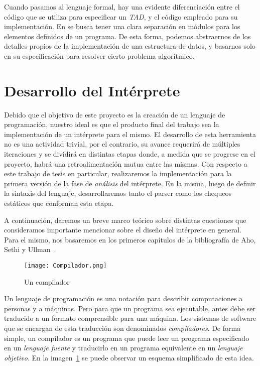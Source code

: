 Cuando pasamos al lenguaje formal, hay una evidente diferenciación entre el código que se utiliza para especificar un \textit{TAD}, y el código empleado para su implementación.
En \Lenguaje{} se busca tener una clara separación en módulos para los elementos definidos de un programa.
De esta forma, podemos abstraernos de los detalles propios de la implementación de una estructura de datos, y basarnos solo en su especificación para resolver cierto problema algorítmico.

\section{Desarrollo del Intérprete}

Debido que el objetivo de este proyecto es la creación de un lenguaje de programación, nuestro ideal es que el producto final del trabajo sea la implementación de un intérprete para el mismo.
El desarrollo de esta herramienta no es una actividad trivial, por el contrario, su avance requerirá de múltiples iteraciones y se dividirá en distintas etapas donde, a medida que se progrese en el proyecto, habrá una retroalimentación mutua entre las mismas.
Con respecto a este trabajo de tesis en particular, realizaremos la implementación para la primera versión de la fase de \textit{análisis} del intérprete.
En la misma, luego de definir la sintaxis del lenguaje, desarrollaremos tanto el parser como los chequeos estáticos que conforman esta etapa.

A continuación, daremos un breve marco teórico sobre distintas cuestiones que consideramos importante mencionar sobre el diseño del intérprete en general.
Para el mismo, nos basaremos en los primeros capítulos de la bibliografía de Aho, Sethi y Ullman~\cite{Dragon}.

\begin{figure}[h]
\centering
\texttt{[image: Compilador.png]}
\caption{Un compilador}
\label{Compilador}
\end{figure}

Un lenguaje de programación es una notación para describir computaciones a personas y a máquinas.
Pero para que un programa sea ejecutable, antes debe ser traducido a un formato comprensible para una máquina.
Los sistemas de software que se encargan de esta traducción son denominados \textit{compiladores}.
De forma simple, un compilador es un programa que puede leer un programa especificado en un \textit{lenguaje fuente} y traducirlo en un programa equivalente en un \textit{lenguaje objetivo}.
En la imagen~\ref{Compilador} se puede observar un esquema simplificado de esta idea.

